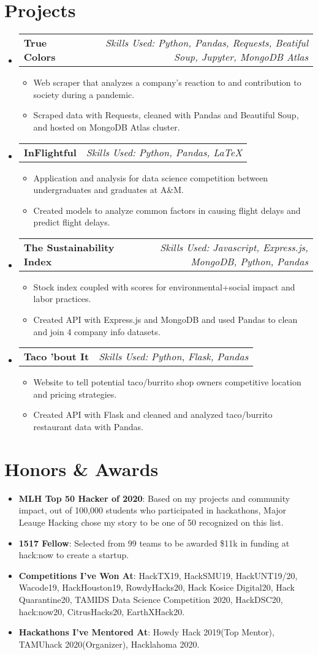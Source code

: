 \documentclass[letterpaper,10pt]{article}
\makeatletter
\newcommand{\resumeItem}[2]{
  \item\small{
    \textbf{#1}{: #2 \vspace{-2pt}}
  }
}
\newcommand{\resumeItemDescription}[1]{
  \item\small{
    #1 \vspace{-2pt}
  }
}
\newcommand{\resumeProjectItem}[2]{
  \vspace{-1pt}\item
    \begin{tabular*}{0.97\textwidth}[t]{l@{\extracolsep{\fill}}r}
      \textbf{#1} & \textit{\small Skills Used: #2} \\
    \end{tabular*}\vspace{-5pt}
  }
\newcommand{\resumeSubItem}[2]{\resumeItem{#1}{#2}\vspace{-4pt}}
\newcommand{\resumeProjectListStart}{\begin{itemize}[leftmargin=*]}
\newcommand{\resumeProjectListEnd}{\end{itemize}}
\newcommand{\resumeSubHeadingListStart}{\begin{itemize}[leftmargin=*]}
\newcommand{\resumeSubHeadingListEnd}{\end{itemize}}
\newcommand{\resumeItemListStart}{\begin{itemize}}
\newcommand{\resumeItemListEnd}{\end{itemize}\vspace{-5pt}}
\makeatother
\begin{document}
\section{Projects} 
  \resumeProjectListStart 
    \resumeProjectItem{True Colors}{Python, Pandas, Requests, Beatiful Soup, Jupyter, MongoDB Atlas}
      \resumeItemListStart
        \resumeItemDescription{Web scraper that analyzes a company's reaction to and contribution to society during a pandemic.}
        \resumeItemDescription{Scraped data with Requests, cleaned with Pandas and Beautiful Soup, and hosted on MongoDB Atlas cluster.}
      \resumeItemListEnd
    \resumeProjectItem{InFlightful}{Python, Pandas, \LaTeX}
      \resumeItemListStart
        \resumeItemDescription{Application and analysis for data science competition between undergraduates and graduates at A\&M.}
        \resumeItemDescription{Created models to analyze common factors in causing flight delays and predict flight delays.}
      \resumeItemListEnd
    \resumeProjectItem{The Sustainability Index}{Javascript, Express.js, MongoDB, Python, Pandas}
      \resumeItemListStart
        \resumeItemDescription{Stock index coupled with scores for environmental+social impact and labor practices.}
        \resumeItemDescription{Created API with Express.js and MongoDB and used Pandas to clean and join 4 company info datasets.}
      \resumeItemListEnd
    \resumeProjectItem{Taco 'bout It}{Python, Flask, Pandas}
      \resumeItemListStart
        \resumeItemDescription{Website to tell potential taco/burrito shop owners competitive location and pricing strategies.}
        \resumeItemDescription{Created API with Flask and cleaned and analyzed taco/burrito restaurant data with Pandas.}
      \resumeItemListEnd
  \resumeProjectListEnd

\section{Honors \& Awards}
  \resumeSubHeadingListStart 
    \resumeSubItem{MLH Top 50 Hacker of 2020}{Based on my projects and community impact, out of 100,000 students who participated in hackathons, Major Leauge Hacking chose my story to be one of 50 recognized on this list.}
    \resumeSubItem{1517 Fellow}{Selected from 99 teams to be awarded \$11k in funding at hack:now to create a startup.}
    \resumeSubItem{Competitions I've Won At}{HackTX19, HackSMU19, HackUNT19/20, 
    Wacode19, HackHouston19, RowdyHacks20, Hack Kosice Digital20, Hack Quarantine20, TAMIDS Data Science 
    Competition 2020, HackDSC20, hack:now20, CitrusHacks20, EarthXHack20.}
    \resumeSubItem{Hackathons I've Mentored At}{Howdy Hack 2019(Top Mentor), TAMUhack 2020(Organizer), Hacklahoma 2020.} 
  \resumeSubHeadingListEnd
\end{document}
